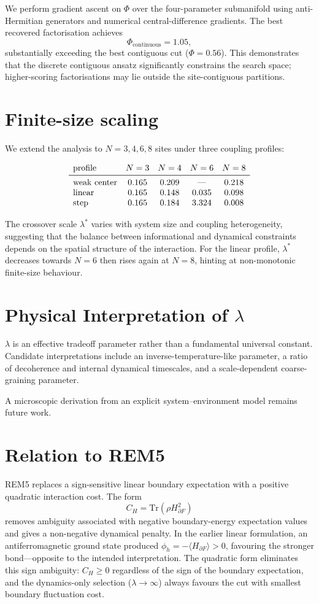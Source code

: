 \documentclass[11pt]{article}
\begin{document}
We perform gradient ascent on $\Phi$ over the four-parameter submanifold using anti-Hermitian generators and numerical central-difference gradients. The best recovered factorisation achieves
\[
\Phi_{\mathrm{continuous}} = 1.05,
\]
substantially exceeding the best contiguous cut ($\Phi=0.56$). This demonstrates that the discrete contiguous ansatz significantly constrains the search space; higher-scoring factorisations may lie outside the site-contiguous partitions.

\section{Finite-size scaling}
We extend the analysis to $N=3,4,6,8$ sites under three coupling profiles:

\[
\begin{array}{lcccc}
\text{profile} & N=3 & N=4 & N=6 & N=8 \\ \midrule
\text{weak center} & 0.165 & 0.209 & \text{---} & 0.218 \\
\text{linear}       & 0.165 & 0.148 & 0.035 & 0.098 \\
\text{step}         & 0.165 & 0.184 & 3.324 & 0.008
\end{array}
\]

The crossover scale $\lambda^*$ varies with system size and coupling heterogeneity, suggesting that the balance between informational and dynamical constraints depends on the spatial structure of the interaction. For the linear profile, $\lambda^*$ decreases towards $N=6$ then rises again at $N=8$, hinting at non-monotonic finite-size behaviour.

\section{Physical Interpretation of $\lambda$}
$\lambda$ is an effective tradeoff parameter rather than a fundamental universal constant. Candidate interpretations include an inverse-temperature-like parameter, a ratio of decoherence and internal dynamical timescales, and a scale-dependent coarse-graining parameter.

A microscopic derivation from an explicit system--environment model remains future work.

\section{Relation to REM5}
REM5 replaces a sign-sensitive linear boundary expectation with a positive quadratic interaction cost. The form
\[
C_H=\mathrm{Tr}(\rho H_{\partial F}^2)
\]
removes ambiguity associated with negative boundary-energy expectation values and gives a non-negative dynamical penalty. In the earlier linear formulation, an antiferromagnetic ground state produced $\phi_h = -\langle H_{\partial F}\rangle > 0$, favouring the stronger bond---opposite to the intended interpretation. The quadratic form eliminates this sign ambiguity: $C_H \geq 0$ regardless of the sign of the boundary expectation, and the dynamics-only selection ($\lambda\to\infty$) always favours the cut with smallest boundary fluctuation cost.
\end{document}
